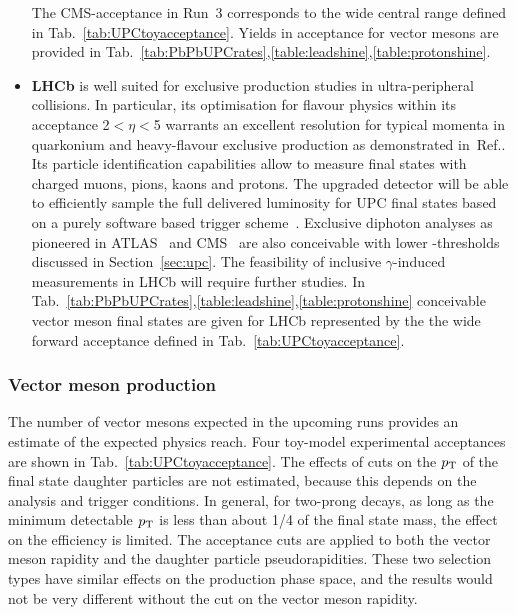 \documentclass[../report.tex]{subfiles}
\begin{document}
\begin{itemize}
The CMS-acceptance in Run~3 corresponds to the wide central range defined in Tab.~\ref{tab:UPCtoyacceptance}. Yields in acceptance for vector mesons are provided in Tab.~\ref{tab:PbPbUPCrates},\ref{table:leadshine},\ref{table:protonshine}.

\item \textbf{LHCb} is well suited for exclusive production studies in ultra-peripheral collisions. In particular, its optimisation for flavour physics within its acceptance 2$<\eta<$5 warrants an excellent resolution for typical momenta in quarkonium and heavy-flavour exclusive production as demonstrated in~Ref.\cite{LHCb-CONF-2018-003}. Its particle identification capabilities allow to measure final states with charged muons, pions, kaons and protons.  The upgraded detector will be able to efficiently sample the full delivered luminosity for UPC final states based on a purely software based trigger scheme~\cite{LHCb-TDR-016}. Exclusive diphoton analyses as pioneered in ATLAS~\cite{Aaboud:2017bwk} and CMS~\cite{CMS-PAS-FSQ-16-012} are also conceivable with lower \ET-thresholds discussed in Section~\ref{sec:upc}. The feasibility of inclusive $\gamma$-induced measurements in LHCb will require further studies. In Tab.~\ref{tab:PbPbUPCrates},\ref{table:leadshine},\ref{table:protonshine} conceivable vector meson final states are given for LHCb represented by the the  wide forward acceptance defined in Tab.~\ref{tab:UPCtoyacceptance}.
\end{itemize}

\subsubsection{Vector meson production}
The number of vector mesons expected in the upcoming runs provides an estimate of the expected physics reach.   Four toy-model experimental acceptances are shown in Tab.~\ref{tab:UPCtoyacceptance}. The effects of cuts on the $p\sb{\scriptstyle\mathrm{T}}$ of the final state daughter particles are not estimated, because this depends on the analysis and trigger conditions.   In general, for two-prong decays, as long as the minimum detectable $p\sb{\scriptstyle\mathrm{T}}$ is less than about 1/4 of the final state mass, the effect on the efficiency is limited.  The acceptance cuts are applied to both the vector meson rapidity and the daughter particle pseudorapidities.  These two selection types have similar effects on the production phase space, and the results would not be very different without the cut on the vector meson rapidity. 
\end{document}
